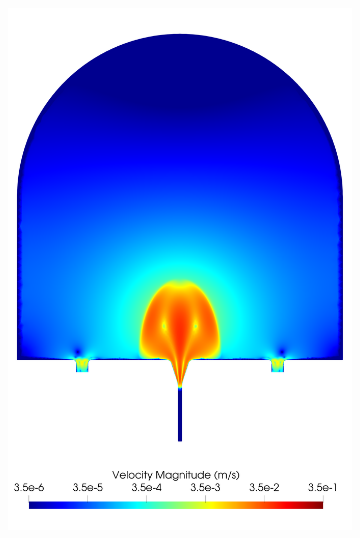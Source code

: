 \begin{figure}
\begin{subfigure}[b]{0.3\textwidth}
            \includegraphics[width=\textwidth]{diagrams/results-modelling/velocity-comparison/meshandsoln_dg_velocity_placentone_13_velocity-log.png}
            \caption{}
            \label{fig:4-models-placentone-norm-log:13}
        \end{subfigure}
        \hfill
        \begin{subfigure}[b]{0.3\textwidth}
            \centering

\end{subfigure}
\end{figure}

